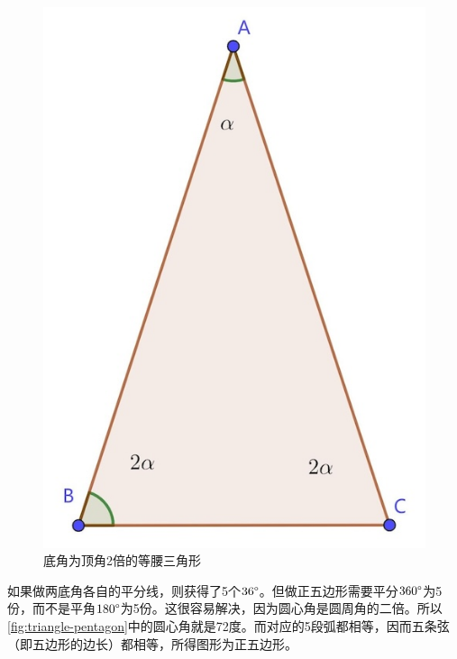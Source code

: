 \documentclass[b5paper]{ctexart}
\begin{document}
\begin{figure}[htbp]
 \centering
 \includegraphics[scale=0.35]{img/isosceles72}
 \caption{底角为顶角2倍的等腰三角形}
 \label{fig:isosceles72}
\end{figure}

如果做两底角各自的平分线，则获得了5个$36\degree$。但做正五边形需要平分$360\degree$为5份，而不是平角$180\degree$为5份。这很容易解决，因为圆心角是圆周角的二倍。所以\cref{fig:triangle-pentagon}中的圆心角就是72度。而对应的5段弧都相等，因而五条弦（即五边形的边长）都相等，所得图形为正五边形。
\end{document}
